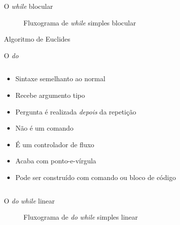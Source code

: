 \documentclass[14pt]{beamer}
\begin{document}
		\begin{frame}{O \textit{while} blocular}
			\begin{figure}[H]
				\centering
				
				\caption{Fluxograma de \textit{while} simples blocular}
				\label{fig.flow.while.block}
			\end{figure}
		\end{frame}

		\begin{frame}{Algoritmo de Euclides}
			
		\end{frame}


		\begin{frame}{O \textit{do}}
			\begin{columns}
				\begin{column}{.65\textwidth}
					\begin{itemize}
						\presentationPause\item Sintaxe semelhanto ao  normal
						\presentationPause\item Recebe argumento tipo 
						\presentationPause\item Pergunta é realizada \emph{depois} da repetição
						\presentationPause\item Não é um comando
						\presentationPause\item É um controlador de fluxo
						\presentationPause\item Acaba com ponto-e-vírgula
						\presentationPause\item Pode ser construído com comando ou bloco de código
					\end{itemize}
					\presentationPause
				\end{column}
				\begin{column}{.35\textwidth}
					\presentationPause
				\end{column}
			\end{columns}
		\end{frame}

		\begin{frame}{O \textit{do} \textit{while} linear}
			\begin{figure}[H]
				\centering
				
				\caption{Fluxograma de \textit{do} \textit{while} simples linear}
				\label{fig.flow.while.line}
			\end{figure}
		\end{frame}
\end{document}
